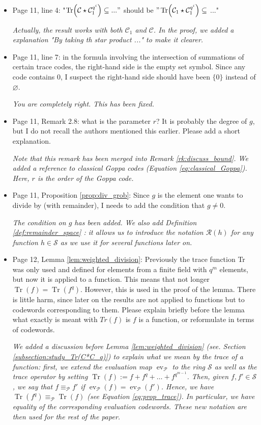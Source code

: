 \documentclass[12pt,a4paper]{amsart}
\DeclareMathOperator{\trace}{Tr}
\DeclareMathOperator{\ev}{ev}
\newcommand{\calC}{\mathcal{C}}
\newcommand{\calP}{\mathcal{P}}
\newcommand{\Tr}[1]{\trace\!\left(#1\right)}
\begin{document}
\begin{itemize}
\item Page 11, line 4: "$\Tr{\calC \star \calC_1^{q^i}} \subseteq ..."$ should be $"\Tr{\calC_1 \star \calC_1^{q^i}} \subseteq$ ..."

\textit{Actually, the result works with both $\calC_1$ and $\calC$. In the proof, we added a explanation  "By taking th star product ..." to make it clearer.} 

\item Page 11, line 7: in the formula involving the intersection of summations of certain trace codes, the right-hand side is the empty set symbol. Since any code contains 0, I suspect the right-hand side should have been $\{0\}$ instead of $\varnothing$.

\textit{You are completely right. This has been fixed.}

\item Page 11, Remark 2.8: what is the parameter $r$? It is probably the degree of $g$, but I do not recall the authors mentioned this earlier. Please add a short explanation.

\textit{Note that this remark has been merged into Remark \ref{rk:discuss_bound}. We added a reference to classical Goppa codes (Equation \eqref{eq:classical_Goppa}). Here, $r$ is the order of the Goppa code.} 

\item Page 11, Proposition \ref{prop:div_grob}: Since $g$ is the element one wants to divide by (with remainder), I needs to add the condition that $g \neq 0$.

\textit{The condition on $g$ has been added. We also add Definition \ref{def:remainder_space} : it allows us to introduce the notation $\mathcal{R}(h)$ for any function $h \in \mathcal{S}$ as we use it for several functions later on.} 

\item Page 12, Lemma \ref{lem:weighted_division}: Previously the trace function Tr was only used and defined for elements from a finite field with $q^m$ elements, but now it is applied to a function. This means that not longer $\Tr{f}=\Tr{f^q}$. However, this is used in the proof of the lemma. There is little harm, since later on the results are not applied to functions but to codewords corresponding to them. Please explain briefly before the lemma what exactly is meant with $Tr(f)$ is $f$ is a function, or reformulate in terms of codewords.

\textit{We added a discussion before Lemma \ref{lem:weighted_division} (see. Section \ref{subsection:study_Tr(C*C_q)}) to explain what we mean by the trace of a function: first, we extend the evaluation map $\ev_{\calP}$ to the ring $\mathcal{S}$ as well as the trace operator by setting $\Tr{f}:=f+f^q+\dots + f^{q^{m-1}}$. Then, given $f,f' \in \mathcal{S}$, we say that $f \equiv_{\calP} f'$ if $\ev_{\calP}(f)=\ev_{\calP}(f')$. Hence, we have $\Tr{f^q} \equiv_{\calP}\Tr{f}$ (see Equation \eqref{eq:prop_trace}). In particular, we have equality of the corresponding evaluation codewords. These new notation are then used for the rest of the paper.}


\end{itemize}
\end{document}
